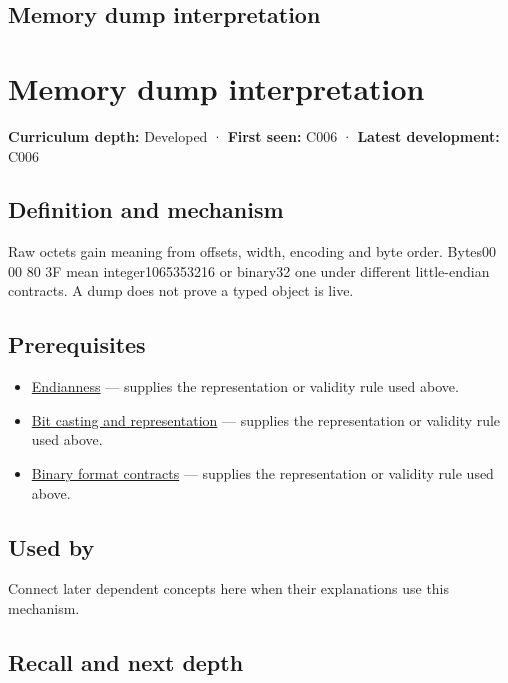 \hypertarget{appendix-230b59c0676b}{}
\section*{Memory dump interpretation}
\chapter{Memory dump interpretation}\label{appendix-230b59c0676b-memory-dump-interpretation}

\textbf{Curriculum depth:} Developed · \textbf{First seen:} C006 · \textbf{Latest development:} C006

\section{Definition and mechanism}\label{appendix-230b59c0676b-definition-and-mechanism}

Raw octets gain meaning from offsets, width, encoding and byte order. Bytes00 00 80 3F mean integer1065353216 or binary32 one under different little-endian contracts. A dump does not prove a typed object is live.

\section{Prerequisites}\label{appendix-230b59c0676b-prerequisites}

\begin{itemize}
\tightlist
\item
  \hyperref[appendix-bc07c3d25b18]{Endianness} --- supplies the representation or validity rule used above.
\item
  \hyperref[appendix-34ee45f161c1]{Bit casting and representation} --- supplies the representation or validity rule used above.
\item
  \hyperref[appendix-590bbb2424c1]{Binary format contracts} --- supplies the representation or validity rule used above.
\end{itemize}

\section{Used by}\label{appendix-230b59c0676b-used-by}

Connect later dependent concepts here when their explanations use this mechanism.

\section{Recall and next depth}\label{appendix-230b59c0676b-recall-and-next-depth}

